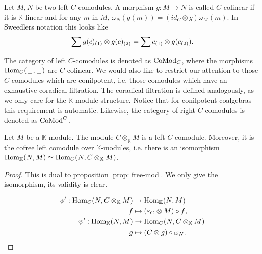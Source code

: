 \documentclass[../thesis.tex]{subfiles}
\begin{document}
                \begin{definition}
                    Let $M,N$ be two left $C$-comodules. A morphism $g:M\rightarrow N$ is called $C$-colinear if it is $\mathbb{K}$-linear and for any $m$ in $M$, $\omega_N(g(m)) = (id_C\otimes g)\omega_M(m)$. In Sweedlers notation this looks like
                    \begin{align*}
                        \sum g(c)_{(1)}\otimes g(c)_{(2)} = \sum c_{(1)}\otimes g(c_{(2)})\tt{.}
                    \end{align*}
                \end{definition}

                The category of left $C$-comodules is denoted as $\tt{CoMod}_C$, where the morphisms $\tt{Hom}_C(\argument,\argument)$ are $C$-colinear. We would also like to restrict our attention to those $C$-comodules which are conilpotent, i.e. those comodules which have an exhaustive coradical filtration. The coradical filtration is defined analogously, as we only care for the $\mathbb{K}$-module structure. Notice that for conilpotent coalgebras this requirement is automatic. Likewise, the category of right $C$-comodules is denoted as $\tt{CoMod}^C$.

                \begin{proposition}\label{prop: cofree-comod}
                    Let $M$ be a $\mathbb{K}$-module. The module $C\otimes_{\mathbb{K}}M$ is a left $C$-comodule. Moreover, it is the cofree left comodule over $\mathbb{K}$-modules, i.e. there is an isomorphism $\tt{Hom}_{\mathbb{K}}(N,M)\simeq \tt{Hom}_C(N,C\otimes_{\mathbb{K}}M)$. 
                \end{proposition}

                \begin{proof}
                    This is dual to proposition \ref{prop: free-mod}. We only give the isomorphism, its validity is clear.

                    \begin{align*}
                        \phi' : \tt{Hom}_C(N,C\otimes_\mathbb{K}M) & \rightarrow \tt{Hom}_\mathbb{K}(N,M) \\
                        f & \mapsto (\varepsilon_C \otimes M) \circ f\tt{,} \\
                        \psi' : \tt{Hom}_\mathbb{K}(N,M) & \rightarrow \tt{Hom}_C(N,C\otimes_\mathbb{K}M) \\
                        g & \mapsto (C \otimes g) \circ \omega_N\tt{.}
                    \end{align*}
                \end{proof}
\end{document}
